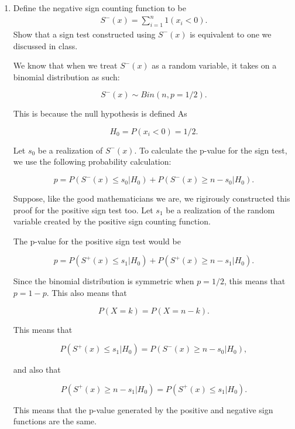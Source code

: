 \documentclass{article}
\begin{document}
	\begin{enumerate}
		\item Define the negative sign counting function to be
			\begin{align*}
				S^{-}(x) = \sum_{i=1}^n 1(x_i < 0).
			\end{align*}
			Show that a sign test constructed using $S^{-}(x)$ is equivalent to one we discussed in class.

			We know that when we treat $S^-(x)$ as a random variable, it takes on a binomial distribution as such:

			$$S^-(x) \sim Bin(n, p = 1/2).$$

			This is because the null hypothesis is defined As

			$$H_0 = P(x_i < 0) = 1/2.$$

			Let $s_0$ be a realization of $S^-(x)$. To calculate the p-value for the sign test, we use the following probability calculation:

			$$p = P(S^-(x) \leq s_0 | H_0) + P(S^-(x) \geq n - s_0 | H_0).$$

			Suppose, like the good mathematicians we are, we rigirously constructed this proof for the positive sign test too. Let $s_1$ be a realization of the random variable created by the positive sign counting function.

			The p-value for the positive sign test would be

			$$p = P(S^+(x) \leq s_1 | H_0) + P(S^+(x) \geq n - s_1 | H_0).$$

			Since the binomial distribution is symmetric when $p = 1/2$, this means that $p = 1 - p$. This also means that

			$$P(X = k) = P(X = n - k).$$

			This means that

			$$P(S^+(x) \leq s_1 | H_0) = P(S^-(x) \geq n - s_0 | H_0),$$

			and also that 

			$$P(S^+(x) \geq n - s_1 | H_0) = P(S^+(x) \leq s_1 | H_0).$$

			This means that the p-value generated by the positive and negative sign functions are the same.



\end{enumerate}
\end{document}
